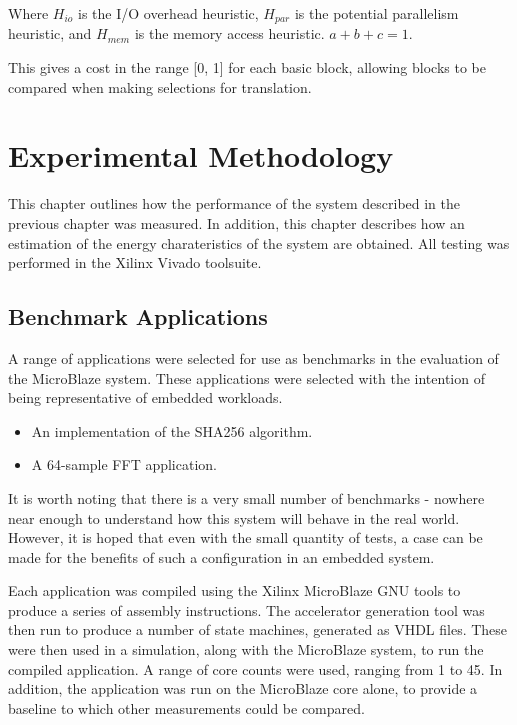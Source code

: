\documentclass{UoYCSproject}
\begin{document}
Where \(H_{io}\) is the I/O overhead heuristic, \(H_{par}\) is the potential parallelism heuristic, and \(H_{mem}\) is the
memory access heuristic. \(a + b + c = 1\).

This gives a cost in the range [0, 1] for each basic block, allowing blocks to be compared when making selections for translation.

\chapter{Experimental Methodology}

This chapter outlines how the performance of the system described in the previous chapter was measured.
In addition, this chapter describes how an estimation of the energy charateristics of the system are obtained.
All testing was performed in the Xilinx Vivado toolsuite.

\section{Benchmark Applications}

A range of applications were selected for use as benchmarks in the evaluation of the MicroBlaze system. These applications
were selected with the intention of being representative of embedded workloads.

\begin{itemize}
  \item An implementation of the SHA256 algorithm.
  \item A 64-sample FFT application.
\end{itemize}

It is worth noting that there is a very small number of benchmarks - nowhere near enough to understand how this system
will behave in the real world. However, it is hoped that even with the small quantity of tests, a case can be made for the
benefits of such a configuration in an embedded system.

Each application was compiled using the Xilinx MicroBlaze GNU tools to produce a series of assembly instructions. The
accelerator generation tool was then run to produce a number of state machines, generated as VHDL files.
These were then used in a simulation, along with the MicroBlaze system, to run the compiled application.
A range of core counts were used, ranging from 1 to 45. In addition, the application was run on the MicroBlaze core alone,
to provide a baseline to which other measurements could be compared.
\end{document}
